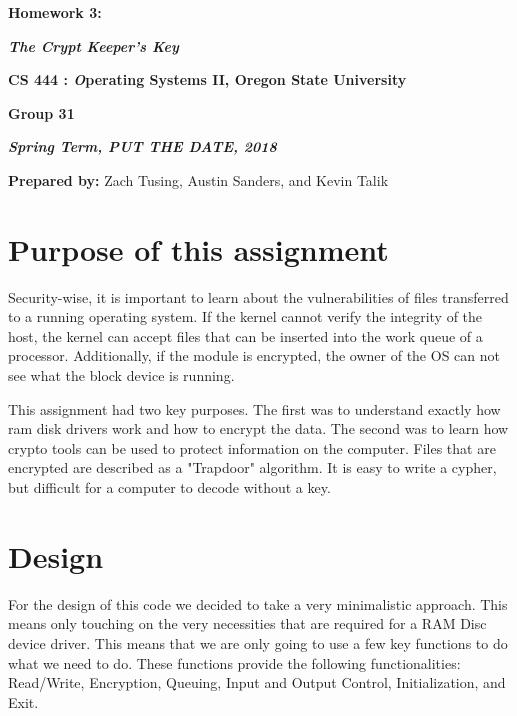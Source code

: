\documentclass[onecolumn, draftclsnofoot,10pt, compsoc]{IEEEtran}
\def \GroupMemberOne{			Zach Tusing}
\def \GroupMemberTwo{			Austin Sanders}
\def \GroupMemberThree{			Kevin Talik}
\begin{document}
 	\begin{center}
	\huge\bf{ Homework 3:} 
   
    \large\textbf{\textit{ The Crypt Keeper's Key }}\par
     
    
    
	\small{\bf CS 444 : \textit Operating Systems II, Oregon State University}\par
    \small{\bf{Group 31}}
    
    
    {\bf\textit{ Spring Term, PUT THE DATE, 2018} }
    
    
    {\small {\bf Prepared by:} \GroupMemberOne, \GroupMemberTwo, and \GroupMemberThree }
        \end{center}
 		\vfill

       \pagebreak
       \section{ Purpose of this assignment }

        Security-wise, it is important to learn about the vulnerabilities of files transferred to a running operating system. If the kernel cannot verify the integrity of the host, the kernel can accept files that can be inserted into the work queue of a processor. Additionally, if the module is encrypted, the owner of the OS can not see what the block device is running.  

		This assignment had two key purposes. The first was to understand exactly how ram disk drivers work and how to encrypt the data. The second was to learn how crypto tools can be used to protect information on the computer. Files that are encrypted are described as a "Trapdoor" algorithm. It is easy to write a cypher, but difficult for a computer to decode without a key. 

	\section{ Design }
    
    	For the design of this code we decided to take a very minimalistic approach. This means only touching on the very necessities that are required for a RAM Disc device driver. This means that we are only going to use a few key functions to do what we need to do. These functions provide the following functionalities: Read/Write, Encryption, Queuing, Input and Output Control, Initialization, and Exit.
\end{document}
